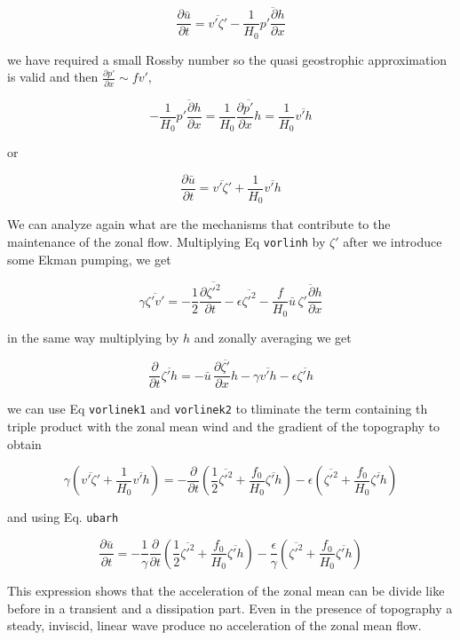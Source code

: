 \[\frac{\partial \bar{u}}{\partial t} = \overline{v'\zeta'} -\frac{1}{H_0}\overline{p'\frac{\partial h}{\partial x}}\]

we have required a small Rossby number so the quasi geostrophic
approximation is valid and then
\(\frac{\partial p'}{\partial x} \sim f v'\),

\[-\frac{1}{H_0}\overline{p'\frac{\partial h}{\partial x}}=\frac{1}{H_0}\overline{\frac{\partial p'}{\partial x} h}=\frac{1}{H_0}\overline{v'h}\]

or

{\[\frac{\partial \bar{u}}{\partial t} = \overline{v'\zeta'} + \frac{1}{H_0}\overline{v'h}\]}

We can analyze again what are the mechanisms that contribute to the
maintenance of the zonal flow. Multiplying Eq \texttt{vorlinh} by
\(\zeta'\) after we introduce some Ekman pumping, we get

{\[\gamma \overline{\zeta'v'}=- \frac{1}{2}\frac{\partial \overline{\zeta'^2}}{\partial t}  -\epsilon\overline{\zeta'^2}-\frac{f}{H_0}\bar{u}\,\overline{\zeta'\frac{\partial h}{\partial x}}\]}

in the same way multiplying by \(h\) and zonally averaging we get

{\[\frac{\partial }{\partial t}\overline{\zeta'h} = -\bar{u}\, \overline{\frac{\partial \zeta'}{\partial x} h} -\gamma \overline{v'h} -\epsilon\overline{\zeta'h}\]}

we can use Eq \texttt{vorlinek1} and \texttt{vorlinek2} to tliminate the
term containing th triple product with the zonal mean wind and the
gradient of the topography to obtain

\[\gamma\left(\overline{v'\zeta'} + \frac{1}{H_0}\overline{v'h}\right) = -\frac{\partial }{\partial t}\left(\frac{1}{2}\overline{\zeta'^2}+ \frac{f_0}{H_0}\overline{\zeta'h}\right) -\epsilon\left( \overline{\zeta'^2}+ \frac{f_0}{H_0}\overline{\zeta'h}\right)\]

and using Eq. \texttt{ubarh}

{\[\frac{\partial \bar{u}}{\partial t}= -\frac{1}{\gamma}\frac{\partial }{\partial t}\left(\frac{1}{2}\overline{\zeta'^2}+ \frac{f_0}{H_0}\overline{\zeta'h}\right) -\frac{\epsilon}{\gamma}\left( \overline{\zeta'^2}+ \frac{f_0}{H_0}\overline{\zeta'h}\right)\]}

This expression shows that the acceleration of the zonal mean can be
divide like before in a transient and a dissipation part. Even in the
presence of topography a steady, inviscid, linear wave produce no
acceleration of the zonal mean flow.

